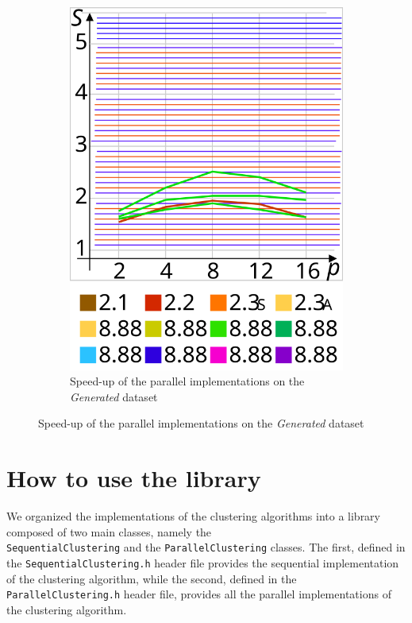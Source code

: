 \documentclass{article}
\begin{document}
\begin{figure}[H]
\begin{subfigure}{.47\linewidth}
\includegraphics[width=\linewidth]{speed-up-1}
\caption*{Speed-up of the parallel implementations on the \textit{Generated} dataset}
\end{subfigure}
\end{figure}


\hypertarget{how-to-use-the-library}{
\section{How to use the library}
\label{how-to-use-the-library}}


We organized the implementations of the clustering algorithms into a library composed of two
main classes, namely the\\
\texttt{SequentialClustering} and the \texttt{ParallelClustering} classes.
The first, defined in the \texttt{SequentialClustering.h} header file provides the sequential
implementation of the clustering algorithm, while the second, defined in the
\texttt{ParallelClustering.h} header file, provides all the parallel implementations of the
clustering algorithm.
\end{document}
